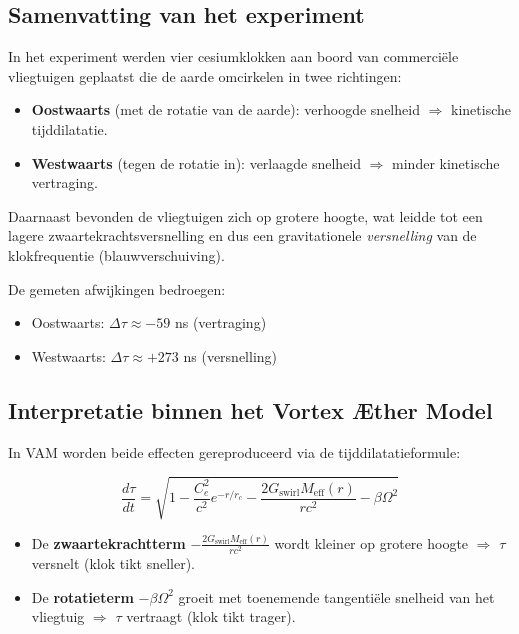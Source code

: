 \subsection{Samenvatting van het experiment}

In het experiment werden vier cesiumklokken aan boord van commerciële vliegtuigen geplaatst die de aarde omcirkelen in twee richtingen:

\begin{itemize}
    \item \textbf{Oostwaarts} (met de rotatie van de aarde): verhoogde snelheid $\Rightarrow$ kinetische tijddilatatie.
    \item \textbf{Westwaarts} (tegen de rotatie in): verlaagde snelheid $\Rightarrow$ minder kinetische vertraging.
\end{itemize}

Daarnaast bevonden de vliegtuigen zich op grotere hoogte, wat leidde tot een lagere zwaartekrachtsversnelling en dus een gravitationele \emph{versnelling} van de klokfrequentie (blauwverschuiving).

De gemeten afwijkingen bedroegen:

\begin{itemize}
    \item Oostwaarts: $\Delta\tau \approx -59$ ns (vertraging)
    \item Westwaarts: $\Delta\tau \approx +273$ ns (versnelling)
\end{itemize}

\subsection{Interpretatie binnen het Vortex Æther Model}

In VAM worden beide effecten gereproduceerd via de tijddilatatieformule:

\begin{equation}
\frac{d\tau}{dt} = \sqrt{1 - \frac{C_e^2}{c^2} e^{-r/r_c} - \frac{2G_\text{swirl} M_\text{eff}(r)}{rc^2} - \beta \Omega^2}
\end{equation}

\begin{itemize}
    \item De \textbf{zwaartekrachtterm} $- \frac{2G_\text{swirl} M_\text{eff}(r)}{rc^2}$ wordt kleiner op grotere hoogte $\Rightarrow$ $\tau$ versnelt (klok tikt sneller).
    \item De \textbf{rotatieterm} $-\beta \Omega^2$ groeit met toenemende tangentiële snelheid van het vliegtuig $\Rightarrow$ $\tau$ vertraagt (klok tikt trager).
\end{itemize}

